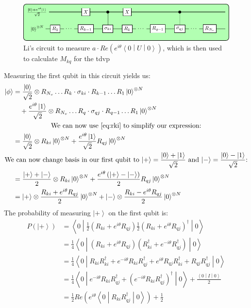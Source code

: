 \documentclass{aux/ttuthes2007}
\newcommand{\ket}[1]{\ensuremath{\left|#1\right\rangle}}
\newcommand{\sandwich}[3]{\left< #1 \middle\vert #2 \middle\vert #3 \right>}
\newcommand{\paren}[1]{\left( #1 \right)}
\newcommand{\elec}{N}
\begin{document}
\begin{figure}[hb!]
  \includegraphics[width=\linewidth]{circuits/circuit2.pdf}
  \caption{Li's circuit to measure $a \cdot Re\paren{e^{i\theta}\sandwich 0 U 0}$, which is then used to calculate $M_{kq}$ for the \gls{tdvp}}
  \label{fig:circuitbenjamin}
\end{figure}
Measuring the first qubit in this circuit yields us:
\begin{equation*}
	\begin{split}
		\ket \phi 
		&= \frac{\ket 0}{\sqrt 2} \otimes R_{N_v} \ldots R_k \cdot \sigma_{ki} \cdot R_{k-1} \ldots R_1 \ket 0^{\otimes \elec}\\
		&\quad + \frac{e^{i\theta}\ket 1}{\sqrt 2} \otimes R_{N_v} \ldots R_q \cdot \sigma_{qj} \cdot R_{q-1} \ldots R_1 \ket 0^{\otimes \elec}\\
		\span\text{We can now use \ref{eq:rki} to simplify our expression:}\\
		&= \frac{\ket 0}{\sqrt 2} \otimes R_{ki} \ket 0^{\otimes \elec}
		+ \frac{e^{i\theta}\ket 1}{\sqrt 2} R_{qj}\ket 0^{\otimes \elec}\\
		\span\text{We can now change basis in our first qubit to
		$\ket + = \frac{\ket 0 + \ket 1}{\sqrt 2}$
		and
		$\ket - = \frac{\ket 0 - \ket 1}{\sqrt 2}$:}\\
		&= \frac{\ket + + \ket -}{2} \otimes R_{ki} \ket 0^{\otimes \elec}
		+ \frac{e^{i\theta}\paren{\ket + - \ket -}}{2} R_{qj}\ket 0^{\otimes \elec}\\
		&= \ket + \otimes \frac{R_{ki} + e^{i\theta}R_{qj}}{2} \ket 0^{\otimes \elec}
		 + \ket - \otimes \frac{R_{ki} - e^{i\theta}R_{qj}}{2} \ket 0^{\otimes \elec}
	\end{split}
\end{equation*}
The probability of measuring $\ket +$ on the first qubit is:
\begin{equation*}
	\begin{split}
		P(\ket +)
		&= \sandwich 0 {
			\frac{1}{2}\paren{R_{ki} + e^{i\theta} R_{qj}}
			\frac{1}{2}\paren{R_{ki} + e^{i\theta} R_{qj}}^{\dagger}
		} 0 \\
		&= \frac 1 4 \sandwich 0 {
			\paren{R_{ki} + e^{i\theta} R_{qj}}
			\paren{R_{ki}^\dagger + e^{-i\theta} R_{qj}^{\dagger}}
		} 0 \\
		&= \frac 1 4 \sandwich 0 {
			R_{ki}R_{ki}^\dagger + e^{-i\theta} R_{ki}R_{qj}^{\dagger} 
			+ e^{i\theta} R_{qj}R_{ki}^\dagger + R_{qj}R_{qj}^\dagger
		} 0 \\
		&= \frac 1 4 \sandwich 0 {
			e^{-i\theta} R_{ki}R_{qj}^{\dagger} + \paren{e^{-i\theta} R_{ki}R_{qj}^\dagger}^\dagger
		} 0 
			+ \frac{\sandwich 0 I 0}{2}\\
		&= \frac 1 2 Re\paren{e^{i\theta}\sandwich 0 {
			 R_{ki}R_{qj}^{\dagger}
	} 0 }
			+ \frac{1}{2}\\
	\end{split}
\end{equation*}
\end{document}
